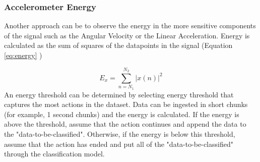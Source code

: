 \subsubsection{Accelerometer Energy}

Another approach can be to observe the energy in the more sensitive components of the signal such as the Angular Velocity or the Linear Acceleration. Energy is calculated as the sum of squares of the datapoints in the signal (Equation \ref{eq:energy} \cite{alexander_title_2017})

\begin{equation}\label{eq:energy}
    E_x = \sum^{N_2}_{n=N_1} |x(n)|^2 
\end{equation}
An energy threshold can be determined by selecting energy threshold that captures the most actions in the dataset. Data can be ingested in short chunks (for example, 1 second chunks) and the energy is calculated. If the energy is above the threshold, assume that the action continues and append the data to the "data-to-be-classified". Otherwise, if the energy is below this threshold, assume that the action has ended and put all of the "data-to-be-classified" through the classification model.
